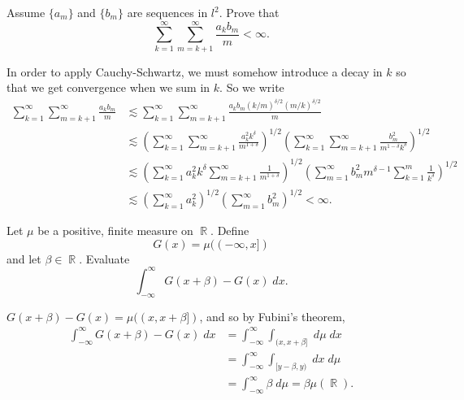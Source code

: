 \documentclass[answers]{exam}
\DeclareMathOperator{\RR}{\mathbb{R}}
\begin{document}
\begin{questions}
\question Assume $\{ a_m \}$ and $\{ b_m \}$ are sequences in $l^2$. Prove that
%
\[ \sum_{k = 1}^\infty \sum_{m = k+1}^\infty \frac{a_k b_m}{m} < \infty. \]
\begin{solution}
	In order to apply Cauchy-Schwartz, we must somehow introduce a decay in $k$ so that we get convergence when we sum in $k$. So we write
	\begin{align*}
		\sum_{k = 1}^\infty \sum_{m = k+1}^\infty \frac{a_k b_m}{m} &\lesssim  \sum_{k = 1}^\infty \sum_{m = k+1}^\infty \frac{a_k b_m (k/m)^{\delta/2} (m/k)^{\delta/2}}{m}\\
		&\lesssim \left( \sum_{k = 1}^\infty \sum_{m = k+1}^\infty \frac{a_k^2 k^\delta}{m^{1 + \delta}} \right)^{1/2} \left( \sum_{k = 1}^\infty \sum_{m = k+1}^\infty \frac{b_m^2}{m^{1 - \delta} k^\delta} \right)^{1/2}\\
		&\lesssim \left( \sum_{k = 1}^\infty a_k^2 k^\delta \sum_{m = k+1}^\infty \frac{1}{m^{1 + \delta}} \right)^{1/2} \left( \sum_{m = 1}^\infty b_m^2 m^{\delta - 1} \sum_{k = 1}^m \frac{1}{k^\delta} \right)^{1/2}\\
		&\lesssim ( \sum_{k = 1}^\infty a_k^2 )^{1/2} \left( \sum_{m = 1}^\infty b_m^2 \right)^{1/2} < \infty.
	\end{align*}
\end{solution}

\question Let $\mu$ be a positive, finite measure on $\RR$. Define
%
\[ G(x) = \mu((-\infty,x]) \]
%
and let $\beta \in \RR$. Evaluate
%
\[ \int_{-\infty}^\infty G(x + \beta) - G(x)\; dx. \]
\begin{solution}
	$G(x + \beta) - G(x) = \mu((x,x + \beta ])$, and so by Fubini's theorem,
	\begin{align*}
		\int_{-\infty}^\infty G(x + \beta) - G(x)\; dx &= \int_{-\infty}^\infty \int_{(x,x + \beta]}\; d\mu\; dx\\
		&= \int_{-\infty}^\infty \int_{[y - \beta, y)}\; dx\; d\mu\\
		&= \int_{-\infty}^\infty \beta\; d\mu = \beta \mu(\RR).
	\end{align*}
\end{solution}


\end{questions}
\end{document}
